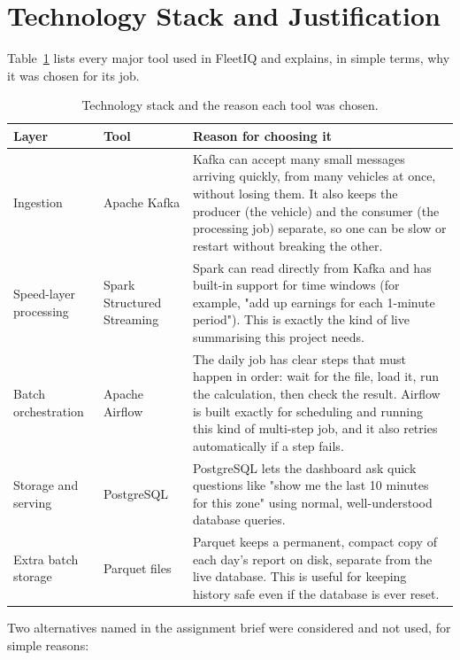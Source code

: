 \documentclass[12pt,a4paper]{article}
\begin{document}
\section{Technology Stack and Justification}

Table~\ref{tab:stack} lists every major tool used in FleetIQ and explains,
in simple terms, why it was chosen for its job.

\begin{center}
\begin{longtable}{@{}p{2.6cm}p{3.4cm}p{8.2cm}@{}}
\caption{Technology stack and the reason each tool was chosen.}
\label{tab:stack}\\
\toprule
\textbf{Layer} & \textbf{Tool} & \textbf{Reason for choosing it} \\
\midrule
\endhead
Ingestion & Apache Kafka & Kafka can accept many small messages arriving
  quickly, from many vehicles at once, without losing them. It also keeps
  the producer (the vehicle) and the consumer (the processing job) separate,
  so one can be slow or restart without breaking the other. \\
Speed-layer processing & Spark Structured Streaming & Spark can read
  directly from Kafka and has built-in support for time windows (for
  example, "add up earnings for each 1-minute period"). This is exactly the
  kind of live summarising this project needs. \\
Batch orchestration & Apache Airflow & The daily job has clear steps that
  must happen in order: wait for the file, load it, run the calculation,
  then check the result. Airflow is built exactly for scheduling and
  running this kind of multi-step job, and it also retries automatically if
  a step fails. \\
Storage and serving & PostgreSQL & PostgreSQL lets the dashboard ask quick
  questions like "show me the last 10 minutes for this zone" using normal,
  well-understood database queries. \\
Extra batch storage & Parquet files & Parquet keeps a permanent, compact
  copy of each day's report on disk, separate from the live database. This
  is useful for keeping history safe even if the database is ever reset. \\
\bottomrule
\end{longtable}
\end{center}

Two alternatives named in the assignment brief were considered and not
used, for simple reasons:
\end{document}
